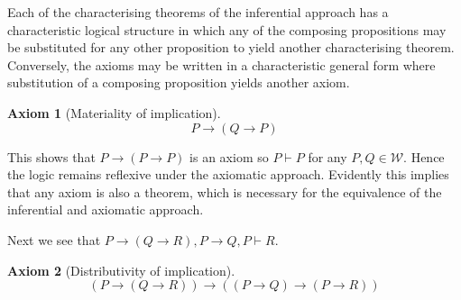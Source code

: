 \documentclass{amsbook}
\newcommand{\infers}{\mathrel\vdash}
\newcommand{\then}{\mathrel\rightarrow}
\theoremstyle{definition}
\newtheorem{axm}{Axiom}[chapter]
\begin{document}
Each of the characterising theorems of the inferential approach has a characteristic logical structure in which any of the composing propositions may be substituted for any other proposition to yield another characterising theorem. Conversely, the axioms may be written in a characteristic general form where substitution of a composing proposition yields another axiom.

\begin{axm}[Materiality of implication]
    $$P \then (Q \then P)$$
\end{axm}

This shows that $P \then (P \then P)$ is an axiom so $P \infers P$ for any $P, Q \in \mathcal W$. Hence the logic remains reflexive under the axiomatic approach. Evidently this implies that any axiom is also a theorem, which is necessary for the equivalence of the inferential and axiomatic approach.

Next we see that $P \then (Q \then R), P \then Q, P \infers R$.

\begin{axm}[Distributivity of implication]
    $$(P \then (Q \then R)) \then ((P \then Q) \then (P \then R))$$
\end{axm}
\end{document}
